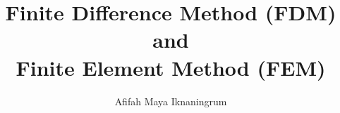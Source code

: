 \documentclass[]{report}
\title{Finite Difference Method (FDM) and \\Finite Element Method (FEM)}
\author{Afifah Maya Iknaningrum}
\begin{document}
\maketitle

\begin{abstract}
\end{abstract}
\end{document}
